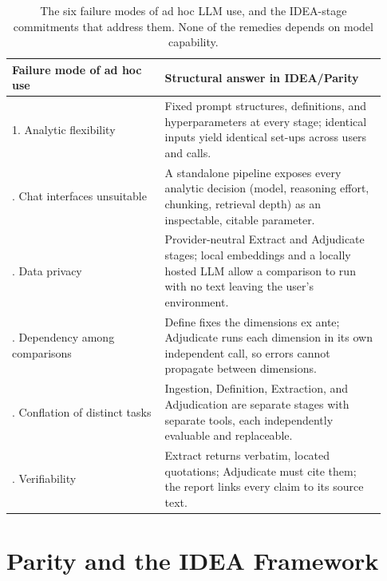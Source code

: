 \documentclass{article}
\begin{document}
\begin{table}[t]
  \centering
  \caption{The six failure modes of ad hoc LLM use, and the IDEA-stage
  commitments that address them. None of the remedies depends on model
  capability.}
  \label{tab:problems-idea}
  \small
  \begin{tabular}{@{}p{0.38\linewidth}p{0.55\linewidth}@{}}
    \toprule
    \textbf{Failure mode of ad hoc use} & \textbf{Structural answer in IDEA/Parity} \\
    \midrule
    1. Analytic flexibility &
    Fixed prompt structures, definitions, and hyperparameters at every stage;
    identical inputs yield identical set-ups across users and calls. \\
    \addlinespace[2pt]
    2. Chat interfaces unsuitable &
    A standalone pipeline exposes every analytic decision (model, reasoning
    effort, chunking, retrieval depth) as an inspectable, citable parameter. \\
    \addlinespace[2pt]
    3. Data privacy &
    Provider-neutral Extract and Adjudicate stages; local embeddings and a
    locally hosted LLM allow a comparison to run with no text leaving the
    user's environment. \\
    \addlinespace[2pt]
    4. Dependency among comparisons &
    Define fixes the dimensions ex ante; Adjudicate runs each dimension in its
    own independent call, so errors cannot propagate between dimensions. \\
    \addlinespace[2pt]
    5. Conflation of distinct tasks &
    Ingestion, Definition, Extraction, and Adjudication are separate stages
    with separate tools, each independently evaluable and replaceable. \\
    \addlinespace[2pt]
    6. Verifiability &
    Extract returns verbatim, located quotations; Adjudicate must cite them;
    the report links every claim to its source text. \\
    \bottomrule
  \end{tabular}
\end{table}

\section{Parity and the IDEA Framework}\label{sec:parity}
\end{document}
